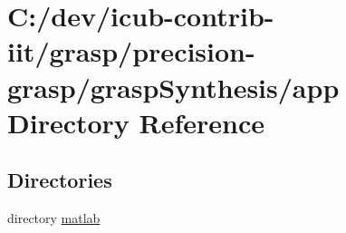 \section{C\+:/dev/icub-\/contrib-\/iit/grasp/precision-\/grasp/grasp\+Synthesis/app Directory Reference}
\label{dir_707e51a282040400ef43d31232de42d6}
\subsection*{Directories}
\begin{DoxyCompactItemize}
\item 
directory \hyperlink{dir_612017fa4f4163be5376787ce7e7dfb4}{matlab}
\end{DoxyCompactItemize}

